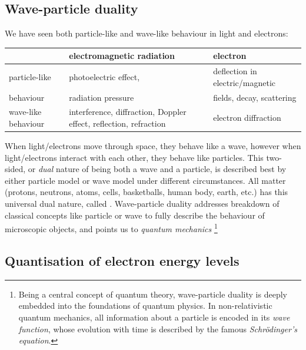 

\subsection{Wave-particle duality}

We have seen both particle-like and wave-like behaviour in light and electrons:

\begin{fullwidth}
\begin{center}
	\begin{tabular}{|D{2.5cm}|D{5.5cm}|D{5cm}|}
		\hline
		& electromagnetic radiation & electron \\ \hline
		particle-like & photoelectric effect, & deflection in electric/magnetic \\
		behaviour & radiation 	pressure &  fields, decay, scattering \\  \hline
		wave-like behaviour & interference, diffraction, Doppler
		effect, reflection, refraction & electron diffraction \\ \hline
	\end{tabular}
\end{center}
\end{fullwidth}


When light/electrons move through space, they behave like a wave, however when light/electrons interact with each other, they behave like particles. This two-sided, or \emph{dual} nature of being both a wave and a particle, is described best by either particle model or wave model under different circumstances. All matter (protons, neutrons, atoms, cells, basketballs, human body, earth, etc.) has this universal dual nature, called . Wave-particle duality addresses breakdown of classical concepts like particle or wave to fully describe the behaviour of microscopic objects, and points us to \emph{quantum mechanics}
\footnote{Being a central concept of quantum theory, wave-particle duality is deeply embedded into the foundations of quantum physics. In non-relativistic quantum mechanics, all information about a particle is encoded in its \emph{wave function}, whose evolution with time is described by the famous \emph{Schr\"odinger's equation}.}




\subsection{Quantisation of electron energy levels}

